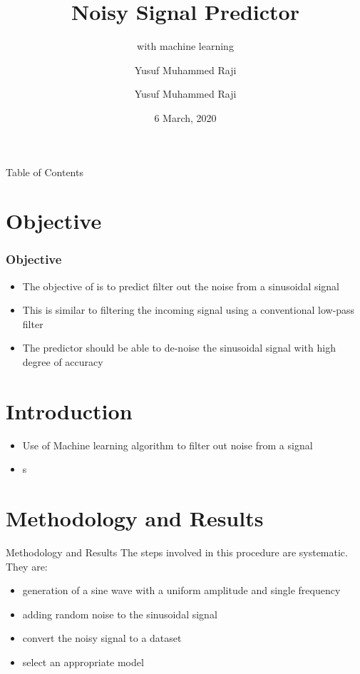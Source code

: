 \documentclass{beamer}
\title[Noisy Signal]{Noisy Signal Predictor}
\subtitle{with machine learning}
\author{Yusuf Muhammed Raji}
\institute[MMU]{Multimedia University}
\date[Mar 2020]{6 March, 2020}
\author{Yusuf Muhammed Raji}
\begin{document}
\begin{frame}
    \begin{titlepage}
        
    \end{titlepage}
\end{frame}

\begin{frame}{Table of Contents}
    \tableofcontents
        
\end{frame}

\section{Objective}

\begin{frame}
    \frametitle{Objective}
    \begin{itemize}
        \item The objective of is to predict filter out the noise from a
        sinusoidal signal
        \item This is similar to filtering the incoming signal using a conventional
        low-pass filter
        \item The predictor should be able to de-noise the sinusoidal signal
        with high degree of accuracy
    \end{itemize}
\end{frame}
\section{Introduction}
\begin{frame}
    \begin{itemize}{Introduction}
        \item Use of Machine learning algorithm to filter out noise from a signal
        \item s
    \end{itemize}
\end{frame}

\section{Methodology and Results}
\begin{frame}{Methodology and Results}
    The steps involved in this procedure are systematic.
    They are:
    \begin{itemize}
        \item generation of a sine wave with a uniform amplitude and single frequency
        \item adding random noise to the sinusoidal signal
        \item convert the noisy signal to a dataset
        \item select an appropriate model 
    \end{itemize}
\end{frame}
\end{document}
